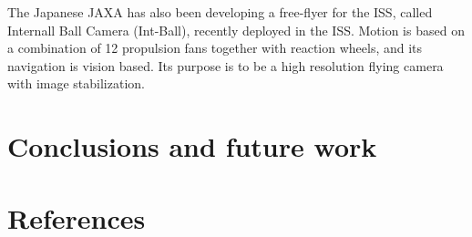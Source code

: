 \documentclass[review]{elsarticle}
\begin{document}
The Japanese JAXA has also been developing a free-flyer for the ISS,
called Internall Ball Camera (Int-Ball), recently deployed in the
ISS. Motion is based on a combination of 12 propulsion fans together
with reaction wheels, and its navigation is vision based. Its purpose
is to be a high resolution flying camera with image stabilization.





\section{Conclusions and future work}
\label{sec:concl-future-work}



\section*{References}


\end{document}
